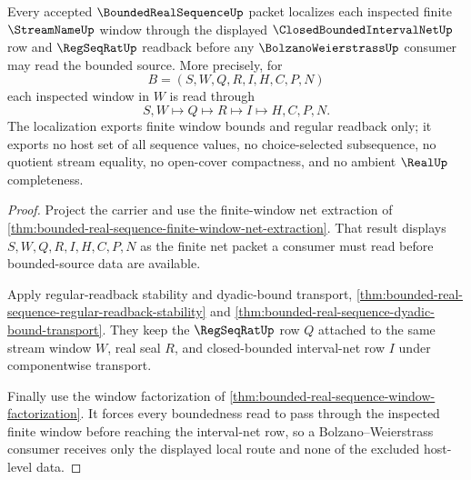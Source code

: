\begin{theorem}
\label{thm:bounded-real-sequence-window-localization}
Every accepted $\BoundedRealSequenceUp$ packet localizes each inspected finite $\StreamNameUp$ window through the displayed $\ClosedBoundedIntervalNetUp$ row and $\RegSeqRatUp$ readback before any $\BolzanoWeierstrassUp$ consumer may read the bounded source. More precisely, for
$$
B=(S,W,Q,R,I,H,C,P,N)
$$
each inspected window in $W$ is read through
$$
S,W \longmapsto Q \longmapsto R \longmapsto I \longmapsto H,C,P,N .
$$
The localization exports finite window bounds and regular readback only; it exports no host set of all sequence values, no choice-selected subsequence, no quotient stream equality, no open-cover compactness, and no ambient $\RealUp$ completeness.
\end{theorem}
\begin{proof}
Project the carrier and use the finite-window net extraction of \autoref{thm:bounded-real-sequence-finite-window-net-extraction}. That result displays $S,W,Q,R,I,H,C,P,N$ as the finite net packet a consumer must read before bounded-source data are available.

Apply regular-readback stability and dyadic-bound transport, \autoref{thm:bounded-real-sequence-regular-readback-stability} and \autoref{thm:bounded-real-sequence-dyadic-bound-transport}. They keep the $\RegSeqRatUp$ row $Q$ attached to the same stream window $W$, real seal $R$, and closed-bounded interval-net row $I$ under componentwise transport.

Finally use the window factorization of \autoref{thm:bounded-real-sequence-window-factorization}. It forces every boundedness read to pass through the inspected finite window before reaching the interval-net row, so a Bolzano--Weierstrass consumer receives only the displayed local route and none of the excluded host-level data.
\end{proof}

